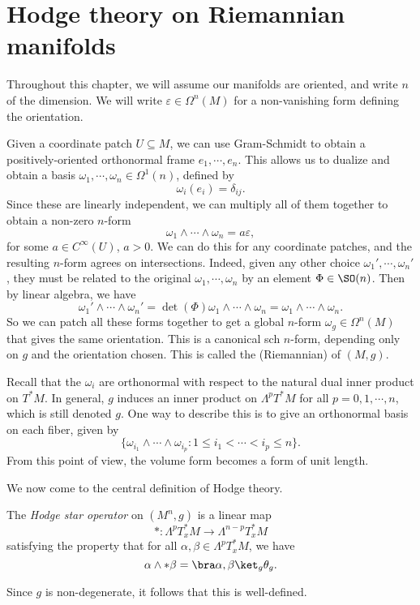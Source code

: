 \documentclass[a4paper]{article}
\begin{document}
\section{Hodge theory on Riemannian manifolds}
Throughout this chapter, we will assume our manifolds are oriented, and write $n$ of the dimension. We will write $\varepsilon \in \Omega^n(M)$ for a non-vanishing form defining the orientation.

Given a coordinate patch $U \subseteq M$, we can use Gram-Schmidt to obtain a positively-oriented orthonormal frame $e_1, \cdots, e_n$. This allows us to dualize and obtain a basis $\omega_1, \cdots, \omega_n \in \Omega^1(n)$, defined by
\[
  \omega_i(e_i) = \delta_{ij}.
\]
Since these are linearly independent, we can multiply all of them together to obtain a non-zero $n$-form
\[
  \omega_1 \wedge \cdots \wedge \omega_n = a \varepsilon,
\]
for some $a \in C^\infty(U)$, $a > 0$. We can do this for any coordinate patches, and the resulting $n$-form agrees on intersections. Indeed, given any other choice $\omega_1', \cdots, \omega_n'$, they must be related to the original $\omega_1, \cdots, \omega_n$ by an element $\Phi \in \SO(n)$. Then by linear algebra, we have
\[
  \omega_1' \wedge \cdots \wedge \omega_n' = \det (\Phi) \omega_1 \wedge \cdots \wedge \omega_n = \omega_1 \wedge \cdots \wedge \omega_n.
\]
So we can patch all these forms together to get a global $n$-form $\omega_g \in \Omega^n(M)$ that gives the same orientation. This is a canonical sch $n$-form, depending only on $g$ and the orientation chosen. This is called the (Riemannian)  of $(M, g)$.

Recall that the $\omega_i$ are orthonormal with respect to the natural dual inner product on $T^* M$. In general, $g$ induces an inner product on $\Lambda^p T^* M$ for all $p = 0, 1, \cdots, n$, which is still denoted $g$. One way to describe this is to give an orthonormal basis on each fiber, given by
\[
  \{\omega_{i_1} \wedge \cdots \wedge \omega_{i_p} : 1 \leq i_1 < \cdots < i_p \leq n\}.
\]
From this point of view, the volume form becomes a form of unit length.

We now come to the central definition of Hodge theory.
\begin{defi}
  The \emph{Hodge star operator} on $(M^n, g)$ is a linear map
  \[
    *: \Lambda^p T^*_x M \to \Lambda^{n - p} T_x^* M
  \]
  satisfying the property that for all $\alpha, \beta \in \Lambda^p T_x^* M$, we have
  \[
    \alpha \wedge *\beta = \bra \alpha, \beta\ket_g \theta_g.
  \]
\end{defi}
Since $g$ is non-degenerate, it follows that this is well-defined.
\end{document}
